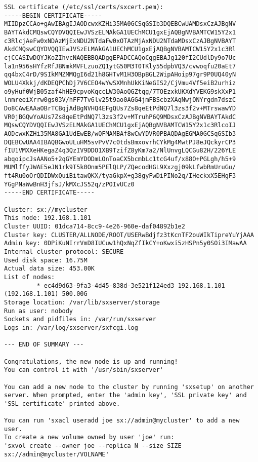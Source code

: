\begin{lstlisting}
SSL certificate (/etc/ssl/certs/sxcert.pem):
-----BEGIN CERTIFICATE-----
MIIDpzCCAo+gAwIBAgIJAODcwxKZHi35MA0GCSqGSIb3DQEBCwUAMDsxCzAJBgNV
BAYTAkdCMQswCQYDVQQIEwJVSzELMAkGA1UEChMCU1gxEjAQBgNVBAMTCW15Y2x1
c3RlcjAeFw0xNDAzMjExNDU2NTdaFw0xOTAzMjAxNDU2NTdaMDsxCzAJBgNVBAYT
AkdCMQswCQYDVQQIEwJVSzELMAkGA1UEChMCU1gxEjAQBgNVBAMTCW15Y2x1c3Rl
cjCCASIwDQYJKoZIhvcNAQEBBQADggEPADCCAQoCggEBAJg120fI2CUdlDy9o7Uc
la1n956sHYfzRfJBNmkMVFLzuoZQ1ytG50M3T0TKly55dpbVQ3/cvwoqfu20aEt7
qq4bxC4rD/9SIkMMZMMQgI6d21h8GHTvM1H3OBpBGL2WipAHoip97gr9P0UQ40yN
WOLU4Xkkj/dKDEQPChDj7V6CEO4wYwSXMnhUkKiNeGIS2/CjVmu4Vf5eiB2urhiz
o9yHuf0WjB05zaf4hHE9cpvoKqccLW30AoQGZtqg/7TOEzxkUKXdYVEKG9skXxP1
lnmreeiXrrw0gs03V/hFF7Tv6lv25t9ao0AGG4jmFBScbzXAqNwjONYrgdn7dszC
Do8CAwEAAaOBrTCBqjAdBgNVHQ4EFgQUs7Zs8qeEtPdNQ7l3zs3f2v+MTrswawYD
VR0jBGQwYoAUs7Zs8qeEtPdNQ7l3zs3f2v+MTruhP6Q9MDsxCzAJBgNVBAYTAkdC
MQswCQYDVQQIEwJVSzELMAkGA1UEChMCU1gxEjAQBgNVBAMTCW15Y2x1c3RlcoIJ
AODcwxKZHi35MA8GA1UdEwEB/wQFMAMBAf8wCwYDVR0PBAQDAgEGMA0GCSqGSIb3
DQEBCwUAA4IBAQBGwoULuHM5svPvV7c0tdsBmxovrhCYkMg4MwtPJ8eJQckyrCP3
fIU1VMXXeHKegaZ4q3QzIV9DDO1XB9TzifZ8yKm7a2/NlUnvgLQCGu82H/226YLE
abqoipcJsAANo5+2qGYEmYDODmLOnToaCX5bcmbLc1tcG4uf/x88O+PGLgh/h5+9
MUMlffyJWAE5eJN1rk9T5k0Onm5PElQLP/ZQecodHGL9Xxzgj09kLfwbRmUruGu/
ft4Ru0oOrQDIDWxQuiBitawQKX/tyaGkpX+g38gyFwDiPINo2q/IHeckxX5EHgF3
YGgPNaWwBnH3jfsJ/kMXcJS52q/zPOIvUCz0
-----END CERTIFICATE-----

Cluster: sx://mycluster
This node: 192.168.1.101
Cluster UUID: 01dca714-8cc9-4e26-960e-daf04892b1e2
Cluster key: CLUSTER/ALLNODE/ROOT/USERwBdjfz3tKcnTF2ouWIkTipreYuYjAAA
Admin key: 0DPiKuNIrrVmD8IUCuw1hQxNqZfIkCY+oKwxi5zHSPn5y0SOi3IMawAA
Internal cluster protocol: SECURE
Used disk space: 16.75M
Actual data size: 453.00K
List of nodes:
         * ec4d9d63-9fa3-4d45-838d-3e521f124ed3 192.168.1.101 (192.168.1.101) 500.00G
Storage location: /var/lib/sxserver/storage
Run as user: nobody
Sockets and pidfiles in: /var/run/sxserver
Logs in: /var/log/sxserver/sxfcgi.log

--- END OF SUMMARY ---

Congratulations, the new node is up and running!
You can control it with '/usr/sbin/sxserver'

You can add a new node to the cluster by running 'sxsetup' on another
server. When prompted, enter the 'admin key', 'SSL private key' and
'SSL certificate' printed above.

You can run 'sxacl useradd joe sx://admin@mycluster' to add a new user.
To create a new volume owned by user 'joe' run:
'sxvol create --owner joe --replica N --size SIZE sx://admin@mycluster/VOLNAME'
\end{lstlisting}
